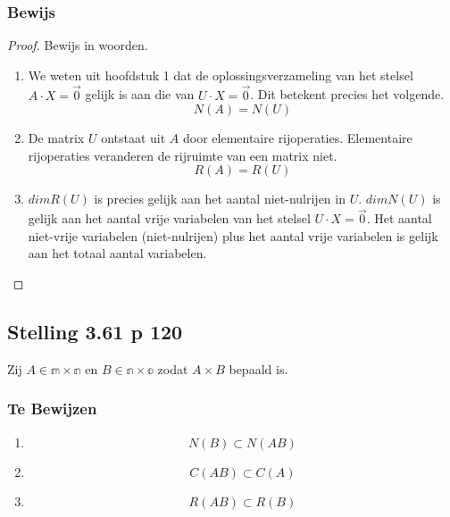 \documentclass[lineaire_algebra_oplossingen.tex]{subfiles}
\begin{document}
\subsubsection*{Bewijs}
\begin{proof}
Bewijs in woorden.
\begin{enumerate}
\item We weten uit hoofdstuk 1 dat de oplossingsverzameling van het stelsel $A\cdot X = \vec{0}$ gelijk is aan die van $U\cdot X = \vec{0}$.
Dit betekent precies het volgende.
\[
N(A) = N(U)
\]
\item De matrix $U$ ontstaat uit $A$ door elementaire rijoperaties. Elementaire rijoperaties veranderen de rijruimte van een matrix niet. 
\[
R(A) = R(U)
\]
\item
$dimR(U)$ is precies gelijk aan het aantal niet-nulrijen in $U$.
$dimN(U)$ is gelijk aan het aantal vrije variabelen van het stelsel $U\cdot X = \vec{0}$. Het aantal niet-vrije variabelen (niet-nulrijen) plus het aantal vrije variabelen is gelijk aan het totaal aantal variabelen.
\end{enumerate}
\end{proof}


\subsection{Stelling 3.61 p 120}
\label{3.61}
Zij $A \in \mathbb{m \times n}$ en $B \in \mathbb{n \times o}$ zodat $A\times B$ bepaald is.

\subsubsection*{Te Bewijzen}
\begin{enumerate}
\item
\[
N(B) \subset N(AB)
\]
\item
\[
C(AB) \subset C(A)
\]
\item
\[ 
R(AB)\subset R(B)
\]
\end{enumerate}
\end{document}
